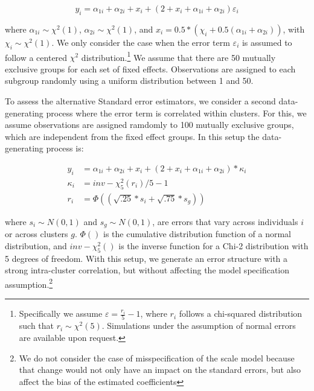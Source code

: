 \documentclass[
  12pt,
  oneside]{article}
\begin{document}
\[y_i = \alpha_{1i} + \alpha_{2i} + x_i + (2+x_i + \alpha_{1i} + \alpha_{2i} ) \varepsilon_i
\]

where \(\alpha_{1i}\sim \chi^2(1)\), \(\alpha_{2i} \sim \chi^2(1)\), and
\(x_i = 0.5 * (\chi_i +0.5(\alpha_{1i}+\alpha_{2i}))\), with
\(\chi_i \sim \chi^2(1)\). We only consider the case when the error term
\(\varepsilon_i\) is assumed to follow a centered \(\chi^2\)
distribution.\footnote{Specifically we assume
  \(\varepsilon=\frac{r_i}{5}-1\), where \(r_i\) follows a chi-squared
  distribution such that \(r_i \sim \chi^2(5)\). Simulations under the
  assumption of normal errors are available upon request.} We assume
that there are 50 mutually exclusive groups for each set of fixed
effects. Observations are assigned to each subgroup randomly using a
uniform distribution between 1 and 50.

To assess the alternative Standard error estimators, we consider a
second data-generating process where the error term is correlated within
clusters. For this, we assume observations are assigned ramdomly to 100
mutually exclusive groups, which are independent from the fixed effect
groups. In this setup the data-generating process is:

\[\begin{aligned}
y_i &= \alpha_{1i} + \alpha_{2i} + x_i + (2+x_i + \alpha_{1i} + \alpha_{2i} )*\kappa_i \\
\kappa_i &= inv-\chi^2_5(r_{i})/5-1 \\
r_i &= \Phi((\sqrt{.25}*s_{i}+\sqrt{.75}*s_{g}))
\end{aligned}
\]

where \(s_{i}\sim N(0,1)\) and \(s_{g}\sim N(0,1)\), are errors that
vary across individuals \(i\) or across clusters \(g\). \(\Phi()\) is
the cumulative distribution function of a normal distribution, and
\(inv-\chi^2_5()\) is the inverse function for a Chi-2 distribution with
5 degrees of freedom. With this setup, we generate an error structure
with a strong intra-cluster correlation, but without affecting the model
specification assumption.\footnote{We do not consider the case of
  misspecification of the scale model because that change would not only
  have an impact on the standard errors, but also affect the bias of the
  estimated coefficients}
\end{document}
